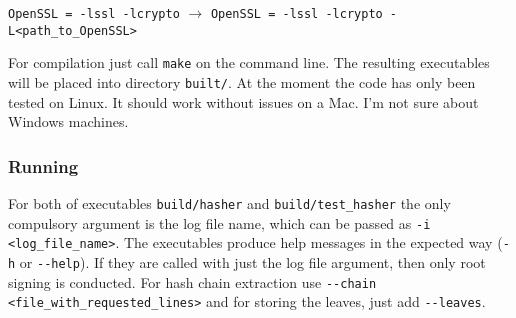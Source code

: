 \documentclass[11pt]{article}
\newcommand{\ct}[1]{\texttt{#1}}
\begin{document}
\begin{center}\ct{OpenSSL = -lssl -lcrypto} \hspace{2pt} $\rightarrow$ \hspace{2pt} \ct{OpenSSL = -lssl -lcrypto -L<path\_to\_OpenSSL>}\end{center}

For compilation just call \ct{make} on the command line. The resulting executables will be placed into directory \ct{built/}. At the moment the code has only been tested on Linux. It should work without issues on a Mac. I'm not sure about Windows machines. 


\subsubsection{Running} %
\label{ssub:running}

For both of executables \ct{build/hasher} and \ct{build/test\_hasher} the only compulsory argument is the log file name, which can be passed as \ct{-i <log\_file\_name>}. The executables produce help messages in the expected way (\ct{-h} or \ct{-{}-help}). If they are called with just the log file argument, then only root signing is conducted. For hash chain extraction use \ct{-{}-chain <file\_with\_requested\_lines>} and for storing the leaves, just add \ct{-{}-leaves}.  





\end{document}
